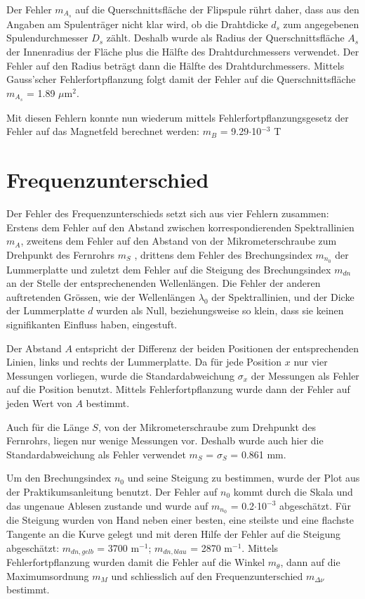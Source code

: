 \documentclass[a4paper,parskip,11pt, DIV12]{scrreprt}
\begin{document}
	Der Fehler $m_{A_s}$ auf die Querschnittsfläche der Flipspule rührt daher, dass aus den Angaben am Spulenträger nicht klar wird, ob die Drahtdicke $d_s$ zum angegebenen Spulendurchmesser $D_s$ zählt. Deshalb wurde als Radius der Querschnittsfläche $A_s$ der Innenradius der Fläche plus die Hälfte des Drahtdurchmessers verwendet. Der Fehler auf den Radius beträgt dann die Hälfte des Drahtdurchmessers. Mittels Gauss'scher Fehlerfortpflanzung folgt damit der Fehler auf die Querschnittsfläche $m_{A_s}$ = 1.89 $\mu $m$^2$. 
	
	Mit diesen Fehlern konnte nun wiederum mittels Fehlerfortpflanzungsgesetz der Fehler auf das Magnetfeld berechnet werden: $m_B$ = 9.29$\cdot $10$^{-3}$ T
	 
	\section{Frequenzunterschied}
	Der Fehler des Frequenzunterschieds setzt sich aus vier Fehlern zusammen: Erstens dem Fehler auf den Abstand zwischen korrespondierenden Spektrallinien $m_A$, zweitens dem Fehler auf den Abstand von der Mikrometerschraube zum Drehpunkt des Fernrohrs $m_S$ , drittens dem Fehler des Brechungsindex $m_{n_0}$ der Lummerplatte und zuletzt dem Fehler auf die Steigung des Brechungsindex $m_{dn}$ an der Stelle der entsprechenenden Wellenlängen. Die Fehler der anderen auftretenden Grössen, wie der Wellenlängen $\lambda_0$ der Spektrallinien, und der Dicke der Lummerplatte $d$  wurden als Null, beziehungsweise so klein, dass sie keinen signifikanten Einfluss haben, eingestuft. 
	
	Der Abstand $A$ entspricht der Differenz der beiden Positionen der entsprechenden Linien, links und rechts der Lummerplatte. Da für jede Position $x$ nur vier Messungen vorliegen, wurde die Standardabweichung $\sigma_x$ der Messungen als Fehler auf die Position benutzt. Mittels Fehlerfortpflanzung wurde dann der Fehler auf jeden Wert von $A$ bestimmt.
	
	Auch für die Länge $S$, von der Mikrometerschraube zum Drehpunkt des Fernrohrs, liegen nur wenige Messungen vor. Deshalb wurde auch hier die Standardabweichung als Fehler verwendet $m_S$ = $\sigma_S$ = 0.861 mm.
	
	Um den Brechungsindex $n_0$ und seine Steigung zu bestimmen, wurde der Plot aus der Praktikumsanleitung benutzt. Der Fehler auf $n_0$ kommt durch die Skala und das ungenaue Ablesen zustande und wurde auf $m_{n_0}$ = 0.2$\cdot$10$^{-3}$ abgeschätzt.
Für die Steigung wurden von Hand neben einer besten, eine steilste und eine flachste Tangente an die Kurve gelegt und mit deren Hilfe der Fehler auf die Steigung abgeschätzt: $m_{dn,gelb}$ = 3700 m$^{-1}$; $m_{dn,blau}$ = 2870 m$^{-1}$.
	Mittels Fehlerfortpflanzung wurden damit die Fehler auf die Winkel $m_{\theta}$, dann auf die Maximumsordnung $m_M$ und schliesslich auf den Frequenzunterschied $m_{\Delta \nu}$ bestimmt.
	\clearpage
	
\end{document}

